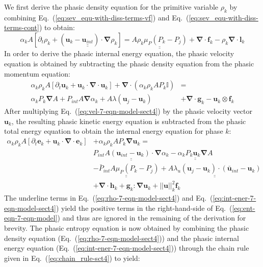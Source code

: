 \documentclass[preprint,10pt]{elsarticle}
\renewcommand{\div}{\mbold{\nabla}\! \cdot \!}
\newcommand{\grad}{\mbold{\nabla}}
\newcommand{\mbold}[1]{\boldsymbol#1}
\newcommand{\eqt}[1]{Eq.~(\ref{#1})}                     %
\begin{document}
%
We first derive the phasic density equation for the primitive variable $\rho_k$ by combining \eqt{eq:sev_equ-with-diss-terms-vf} and \eqt{eq:sev_equ-with-diss-terms-cont} to obtain:
%
\begin{equation}\label{eq:rho-7-eqn-model-sect4}
\alpha_k A \left[ \partial_t \rho_k + \left( \mbold u_k - \underline{\underline{\mbold u_{int}}} \right) \cdot \grad \rho_k \right] = \underline{\underline{A \rho_k \mu_P \left( P_k - P_j \right)}} + \div \mbold f_k - \rho_k \div \mbold l_k
\end{equation}
%
In order to derive the phasic internal energy equation, the phasic velocity equation is obtained by subtracting the phasic density equation from the phasic momentum equation:
%
\begin{align}\label{eq:vel-7-eqn-model-sect4}
\alpha_k \rho_k  A \left[ \partial_t \mbold u_k + \mbold u_k \cdot \div \mbold u_k \right]  + \div \left( \alpha_k \rho_k A P_k \mathbb{I} \right) &=\nonumber\\
\alpha_k P_k \grad A + P_{int} A \grad \alpha_k + A \lambda \left( \mbold u_j - \mbold u_k \right) &+ \div \mbold g_k - \mbold u_k \otimes \mbold f_k
\end{align}
%
After multiplying \eqt{eq:vel-7-eqn-model-sect4} by the phasic velocity vector $\mbold u_k$, the resulting phasic kinetic energy equation is subtracted from the phasic total energy equation to obtain the internal energy equation for phase $k$:
%
\begin{align}\label{eq:int-ener-7-eqn-model-sect4}
\alpha_k \rho_k  A \left[ \partial_t \mbold e_k + \mbold u_k \cdot \div \mbold e_k \right]  &+ \alpha_k \rho_k A P_k \grad \mbold u_k =\nonumber\\
&\underline{\underline{P_{int} A \left(\mbold u_{int}-\mbold u_k \right) \cdot \grad \alpha_k}} -  \underline{\underline{\alpha_k P_k \mbold u_k \grad A}} \nonumber \\ 
&\underline{\underline{-\bar{P}_{int} A \mu_P \left(P_k-P_j \right)}} + \underline{\underline{A \lambda_u \left(\mbold u_j-\mbold u_k  \right) \cdot \left(\bar{\mbold u}_{int}- \mbold u_k \right)}}\nonumber \\
&+ \div \mbold h_k + \mbold g_k : \grad \mbold u_k + || \mbold u ||^2_k \mbold f_k
\end{align}
%
The underline terms in \eqt{eq:rho-7-eqn-model-sect4} and \eqt{eq:int-ener-7-eqn-model-sect4} yield the positive terms in the right-hand-side of \eqt{eq:ent-eqn-7-eqn-model} and thus are ignored in the remaining of the derivation for brevity. The phasic entropy equation is now obtained by combining the phasic density equation (\eqt{eq:rho-7-eqn-model-sect4}) and the phasic internal energy equation (\eqt{eq:int-ener-7-eqn-model-sect4}) through the chain rule given in \eqt{eq:chain_rule-sct4} to yield:
\end{document}
